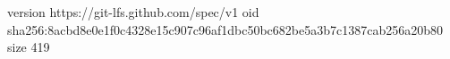 version https://git-lfs.github.com/spec/v1
oid sha256:8acbd8e0e1f0c4328e15c907c96af1dbc50bc682be5a3b7c1387cab256a20b80
size 419
